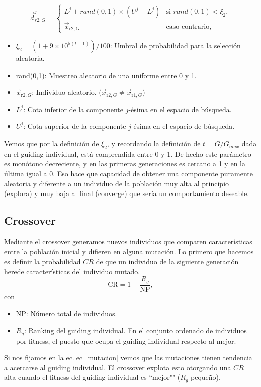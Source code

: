 \documentclass{article}
\begin{document}
\begin{equation}
    \vec{d}^{j}_{r2,G} = \left\{\begin{array}{ll}
            L^{j} + rand(0,1)\times(U^{j}-L^{j})&\text{si }rand(0,1)<\xi_2,\\
            \vec{x}_{\text{r2},G}&\text{caso contrario},
    \end{array}\right.
\label{ec_rand_vec}
\end{equation}
\begin{itemize}
    \item $\xi_{2}=(1+9\times 10^{5(t-1)})/100$: Umbral de probabilidad para la selección aleatoria.
    \item rand(0,1): Muestreo aleatorio de una uniforme entre 0 y 1.
    \item $\vec{x}_{\text{r2},G}$: Individuo aleatorio. ($\vec{x}_{\text{r2},G}\neq\vec{x}_{\text{r1},G}$)
    \item $L^{j}$: Cota inferior de la componente $j$-ésima en el espacio de búsqueda.
    \item $U^{j}$: Cota superior de la componente $j$-ésima en el espacio de búsqueda.
\end{itemize}
Vemos que por la definición de $\xi_{2}$, y recordando la definición de $t=G/G_{max}$ dada en el guiding individual, está comprendida entre 0 y 1. De hecho este parámetro es monótono decreciente, y en las primeras generaciones es cercano a 1 y en la última igual a 0. Eso hace que capacidad de obtener una componente puramente aleatoria y diferente a un individuo de la población muy alta al principio (explora) y muy baja al final (converge) que sería un comportamiento deseable.

\subsection{Crossover}
Mediante el crossover generamos nuevos individuos que comparen características entre la población inicial y difieren en alguna mutación. Lo primero que hacemos es definir la probabilidad $CR$ de que un individuo de la siguiente generación herede características del individuo mutado.
\begin{equation}
    \text{CR} = 1 - \frac{R_g}{\text{NP}},
    \label{ec_CR}
\end{equation}
con
\begin{itemize}
    \item NP: Número total de individuos.
    \item $R_g$: Ranking del guiding individual. En el conjunto ordenado de individuos por fitness, el puesto que ocupa el guiding individual respecto al mejor.
\end{itemize}
Si nos fijamos en la ec.\eqref{ec_mutacion} vemos que las mutaciones tienen tendencia a acercarse al guiding individual. El crossover explota esto otorgando una $CR$ alta cuando el fitness del guiding individual es ``mejor"" ($R_g$ pequeño).
\end{document}
